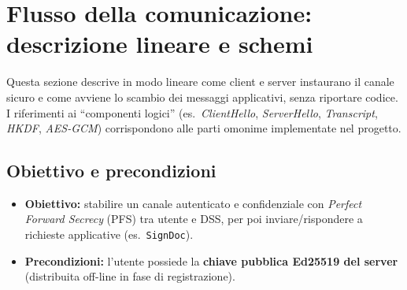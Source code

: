 \section{Flusso della comunicazione: descrizione lineare e schemi}

Questa sezione descrive in modo lineare come client e server instaurano il canale sicuro e come avviene lo scambio dei messaggi applicativi, senza riportare codice. I riferimenti ai ``componenti logici'' (es.\ \emph{ClientHello}, \emph{ServerHello}, \emph{Transcript}, \emph{HKDF}, \emph{AES-GCM}) corrispondono alle parti omonime implementate nel progetto.

\subsection{Obiettivo e precondizioni}
\begin{itemize}
  \item \textbf{Obiettivo:} stabilire un canale autenticato e confidenziale con \emph{Perfect Forward Secrecy} (PFS) tra utente e DSS, per poi inviare/rispondere a richieste applicative (es.\ \texttt{SignDoc}).
  \item \textbf{Precondizioni:} l'utente possiede la \textbf{chiave pubblica Ed25519 del server} (distribuita off-line in fase di registrazione).
\end{itemize}


